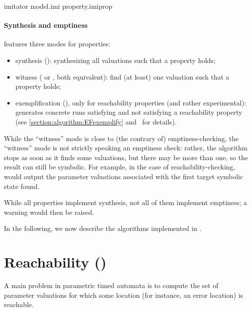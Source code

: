 \begin{terminal}
imitator model.imi property.imiprop
\end{terminal}

\paragraph{Synthesis and emptiness}
\imitator{} features three modes for properties:

\begin{itemize}
	\item synthesis (): synthesizing all valuations such that a property holds;
	\item witness ( or , both equivalent): find (at least) one valuation such that a property holds;
	\item exemplification (), only for reachability properties (and rather experimental): generates concrete runs satisfying and not satisfying a reachability property (see \cref{section:algorithm:EFexemplify} and~\cite{AWUH22} for details).
\end{itemize}

While the ``witness'' mode is close to (the contrary of) emptiness-checking, the ``witness'' mode is not strictly speaking an emptiness check: rather, the algorithm stops as soon as it finds some valuations, but there may be more than one, so the result can still be symbolic.
For example, in the case of reachability-checking, \imitator{} would output the parameter valuations associated with the first target symbolic state found.


While all properties implement synthesis, not all of them implement emptiness; a warning would then be raised.

In the following, we now describe the algorithms implemented in \imitator{}.

\section{Reachability ()}\label{section:algorithm:EFsynth}

A main problem in parametric timed automata is to compute the set of parameter valuations for which some location (for instance, an error location) is reachable.


